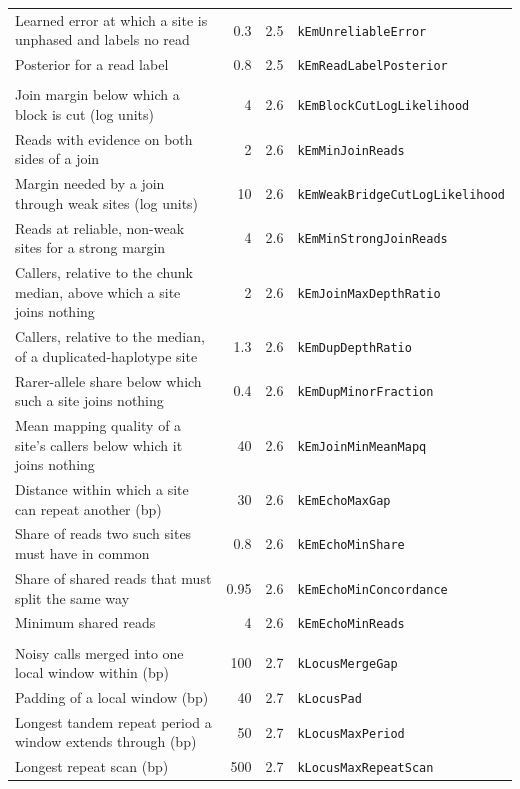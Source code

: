 \documentclass[10pt]{article}
\begin{document}
{\begin{longtable}{@{}>{\raggedright\arraybackslash}p{5.0cm}rrl@{}}
Learned error at which a site is unphased and labels no read & 0.3 & 2.5 & \texttt{kEmUnreliableError} \\
Posterior for a read label & 0.8 & 2.5 & \texttt{kEmReadLabelPosterior} \\
\multicolumn{4}{@{}l}{\emph{Joins}} \\
Join margin below which a block is cut (log units) & 4 & 2.6 & \texttt{kEmBlockCutLogLikelihood} \\
Reads with evidence on both sides of a join & 2 & 2.6 & \texttt{kEmMinJoinReads} \\
Margin needed by a join through weak sites (log units) & 10 & 2.6 & \texttt{kEmWeakBridgeCutLogLikelihood} \\
Reads at reliable, non-weak sites for a strong margin & 4 & 2.6 & \texttt{kEmMinStrongJoinReads} \\
Callers, relative to the chunk median, above which a site joins nothing & 2 & 2.6 & \texttt{kEmJoinMaxDepthRatio} \\
Callers, relative to the median, of a duplicated-haplotype site & 1.3 & 2.6 & \texttt{kEmDupDepthRatio} \\
Rarer-allele share below which such a site joins nothing & 0.4 & 2.6 & \texttt{kEmDupMinorFraction} \\
Mean mapping quality of a site's callers below which it joins nothing & 40 & 2.6 & \texttt{kEmJoinMinMeanMapq} \\
Distance within which a site can repeat another (bp) & 30 & 2.6 & \texttt{kEmEchoMaxGap} \\
Share of reads two such sites must have in common & 0.8 & 2.6 & \texttt{kEmEchoMinShare} \\
Share of shared reads that must split the same way & 0.95 & 2.6 & \texttt{kEmEchoMinConcordance} \\
Minimum shared reads & 4 & 2.6 & \texttt{kEmEchoMinReads} \\
\multicolumn{4}{@{}l}{\emph{Labels for the remaining reads, and output}} \\
Noisy calls merged into one local window within (bp) & 100 & 2.7 & \texttt{kLocusMergeGap} \\
Padding of a local window (bp) & 40 & 2.7 & \texttt{kLocusPad} \\
Longest tandem repeat period a window extends through (bp) & 50 & 2.7 & \texttt{kLocusMaxPeriod} \\
Longest repeat scan (bp) & 500 & 2.7 & \texttt{kLocusMaxRepeatScan} \\

\end{longtable}}
\end{document}
